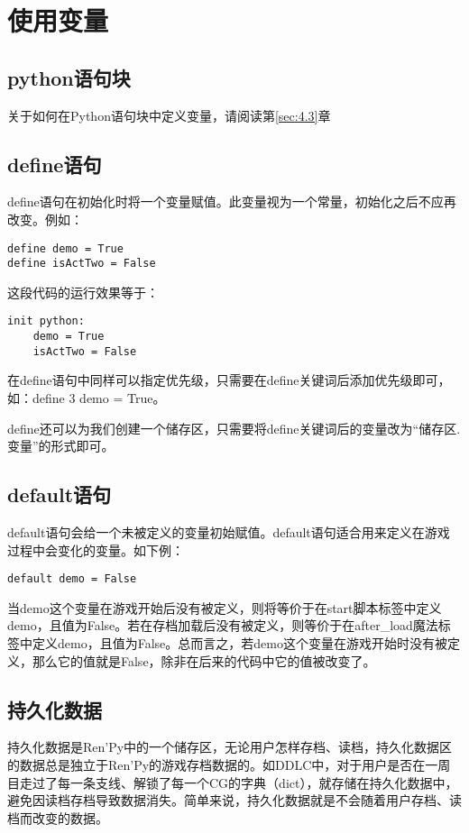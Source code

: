 \section{使用变量}
\subsection{python语句块}
关于如何在Python语句块中定义变量，请阅读第\ref{sec:4.3}章
\subsection{define语句}
define语句在初始化时将一个变量赋值。此变量视为一个常量，初始化之后不应再改变。例如：

\begin{lstlisting}
define demo = True
define isActTwo = False
\end{lstlisting}

这段代码的运行效果等于：
\begin{lstlisting}
init python:
    demo = True
    isActTwo = False
\end{lstlisting}

\begin{ExtraKnowledge}
    在define语句中同样可以指定优先级，只需要在define关键词后添加优先级即可，如：define 3 demo = True。
\end{ExtraKnowledge}

define还可以为我们创建一个储存区，只需要将define关键词后的变量改为“储存区.变量”的形式即可。

\subsection{default语句}
default语句会给一个未被定义的变量初始赋值。default语句适合用来定义在游戏过程中会变化的变量。如下例：
\begin{lstlisting}[numbers=none]
default demo = False
\end{lstlisting}

当demo这个变量在游戏开始后没有被定义，则将等价于在start脚本标签中定义demo，且值为False。若在存档加载后没有被定义，则等价于在after\_load魔法标签中定义demo，且值为False。总而言之，若demo这个变量在游戏开始时没有被定义，那么它的值就是False，除非在后来的代码中它的值被改变了。

\subsection{持久化数据}

持久化数据是Ren'Py中的一个储存区，无论用户怎样存档、读档，持久化数据区的数据总是独立于Ren'Py的游戏存档数据的。如DDLC中，对于用户是否在一周目走过了每一条支线、解锁了每一个CG的字典（dict），就存储在持久化数据中，避免因读档存档导致数据消失。简单来说，持久化数据就是不会随着用户存档、读档而改变的数据。

